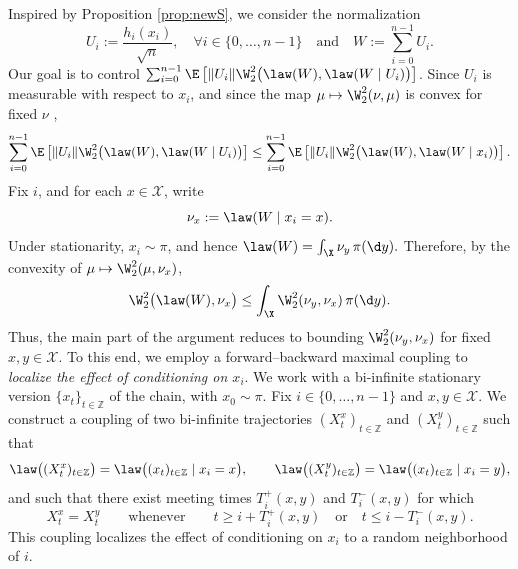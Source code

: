 \documentclass[mnsc,nonblindrev]{informs3}
\begin{document}
Inspired by Proposition \ref{prop:newS}, we 
 consider the normalization \[
U_i:=\frac{h_i(x_i)}{\sqrt n},\quad \forall i \in \{0,\dots, n-1\} \quad \text{and} \quad 
W:=\sum_{i=0}^{n-1}U_i.
\]
Our goal is to control
$\sum_{i=0}^{n-1}\E\left[\|U_i\|\W_2^2\bigl(\law(W),\law(W\mid U_i)\bigr)\right]$.
Since \(U_i\) is measurable with respect to \(x_i\), and since the map
\(\mu \mapsto \W_2^2(\nu,\mu)\) is convex for fixed \(\nu\)
\citep{matthes2009family}, 
\begin{align*}
\sum_{i=0}^{n-1}\E\left[\|U_i\|\W_2^2\bigl(\law(W),\law(W\mid U_i)\bigr)\right]
\le
\sum_{i=0}^{n-1}\E\left[\|U_i\|\W_2^2\bigl(\law(W),\law(W\mid x_i)\bigr)\right].
\end{align*}
Fix \(i\), and for each \(x \in \mathcal X\), write 
\[
  \nu_x:=\law(W\mid x_i=x).
\]
Under stationarity, \(x_i \sim \pi\), and hence $\law(W)=\int_{\X}\nu_y\,\pi(\d y).$ Therefore, by the convexity of \(\mu \mapsto \W_2^2(\mu,\nu_x)\),
\[
  \W_2^2\bigl(\law(W),\nu_x\bigr)
  \le
  \int_{\X}\W_2^2(\nu_y,\nu_x)\,\pi(\d y).
\]
Thus, the main part of the argument reduces to bounding
\(\W_2^2(\nu_y,\nu_x)\) for fixed \(x,y \in \mathcal X\). To this end, we employ a forward--backward maximal coupling to
\emph{localize the effect of conditioning on \(x_i\)}. We work with a
bi-infinite stationary version \(\{x_t\}_{t\in\mathbb Z}\) of the chain,
with \(x_0 \sim \pi\). Fix \(i \in \{0,\dots,n-1\}\) and \(x,y \in \mathcal X\).
We construct a coupling of two bi-infinite trajectories
\((X_t^x)_{t\in\mathbb Z}\) and \((X_t^y)_{t\in\mathbb Z}\) such that
\[
\law\bigl((X_t^x)_{t\in\mathbb Z}\bigr)
=
\law\bigl((x_t)_{t\in\mathbb Z} \mid x_i = x\bigr),
\qquad
\law\bigl((X_t^y)_{t\in\mathbb Z}\bigr)
=
\law\bigl((x_t)_{t\in\mathbb Z} \mid x_i = y\bigr),
\]
and such that there exist meeting times \(T_i^+(x,y)\) and \(T_i^-(x,y)\) for
which
\[
X_t^x = X_t^y
\qquad\text{whenever}\qquad
t \ge i + T_i^+(x,y)
\quad\text{or}\quad
t \le i - T_i^-(x,y).
\]
This coupling localizes the effect of conditioning on \(x_i\) to a random
neighborhood of \(i\).
\end{document}
